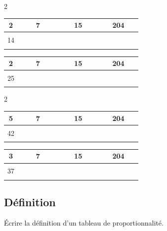 \begin{multicols}{2}
\begin{center} \begin{tabular}{|c|c|c|c|}  \hline
  2  & 7 & 15 & 204 \\  \hline
  14 & $\phantom{\dfrac{azertyuiop}{O}}$ & $\phantom{\dfrac{azertyuiop}{O}}$ & $\phantom{\dfrac{azertyuiop}{O}}$ \\  \hline
\end{tabular} \end{center}

\begin{center} \begin{tabular}{|c|c|c|c|}  \hline
  2  & 7 & 15 & 204 \\  \hline
  25 & $\phantom{\dfrac{azertyuiop}{O}}$ & $\phantom{\dfrac{azertyuiop}{O}}$ & $\phantom{\dfrac{azertyuiop}{O}}$ \\  \hline
\end{tabular} \end{center}
\end{multicols}

\begin{multicols}{2}
\begin{center} \begin{tabular}{|c|c|c|c|}  \hline
  5  & 7 & 15 & 204 \\  \hline
  42 & $\phantom{\dfrac{azertyuiop}{O}}$ & $\phantom{\dfrac{azertyuiop}{O}}$ & $\phantom{\dfrac{azertyuiop}{O}}$ \\  \hline
\end{tabular} \end{center}

\begin{center} \begin{tabular}{|c|c|c|c|}  \hline
  3  & 7 & 15 & 204 \\  \hline
  37 & $\phantom{\dfrac{azertyuiop}{O}}$ & $\phantom{\dfrac{azertyuiop}{O}}$ & $\phantom{\dfrac{azertyuiop}{O}}$ \\  \hline
\end{tabular} \end{center}
\end{multicols}

\subsection*{Définition}

Écrire la définition d'un tableau de proportionnalité.

